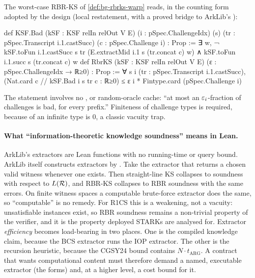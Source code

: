 The worst-case RBR-KS of \cref{def:bg-rbrks-warp} reads, in the counting form adopted by the design
(local restatement, with a proved bridge to ArkLib's
):

\begin{leancode}
def KSF.Bad (kSF : KSF relIn relOut V E) (i : pSpec.ChallengeIdx) (s)
    (tr : pSpec.Transcript i.1.castSucc) (c : pSpec.Challenge i) : Prop :=
  ∃ w, ¬ kSF.toFun i.1.castSucc s tr (E.extractMid i.1 s (tr.concat c) w)
       ∧ kSF.toFun i.1.succ s (tr.concat c) w
def RbrKS (kSF : KSF relIn relOut V E) (ε : pSpec.ChallengeIdx → ℝ≥0) : Prop :=
  ∀ s i (tr : pSpec.Transcript i.1.castSucc),
    (Nat.card {c // kSF.Bad i s tr c} : ℝ≥0) ≤ ε i * Fintype.card (pSpec.Challenge i)
\end{leancode}

\noindent The statement involves no ,  or random-oracle cache: ``at most
an $\varepsilon_i$-fraction of challenges is bad, for every prefix.'' Finiteness of challenge types is
required, because  of an infinite type is $0$, a classic vacuity trap.

\paragraph{What ``information-theoretic knowledge soundness'' means in Lean.} ArkLib's extractors
are Lean functions with no running-time or query bound. ArkLib itself constructs extractors by
. Take the extractor that returns a chosen valid witness whenever one
exists. Then straight-line KS collapses to soundness with respect to $L(\mathcal{R})$, and RBR-KS collapses
to RBR soundness with the same errors. On finite witness spaces a computable brute-force extractor
does the same, so ``computable'' is no remedy. For R1CS this is a weakening, not a vacuity:
unsatisfiable instances exist, so RBR soundness remains a non-trivial property of the verifier, and
it is the property deployed STARKs are analysed for. Extractor \emph{efficiency} becomes
load-bearing in two places. One is the compiled knowledge claim, because the BCS extractor runs the
IOP extractor. The other is the recursion heuristic, because the CGSY24 bound contains
$N\cdot t_{\mathrm{ARG}}$. A contract that wants computational content must therefore demand a
named, executable extractor (the  forms) and, at a higher level, a cost bound for
it.
